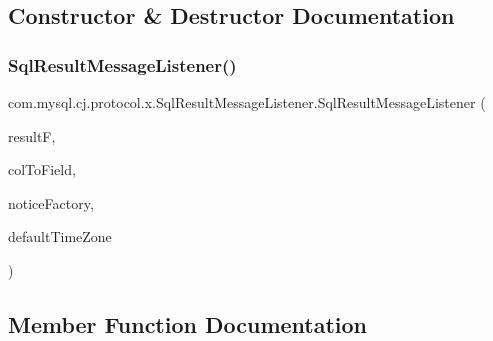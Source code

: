 \subsection{Constructor \& Destructor Documentation}
\mbox{\label{classcom_1_1mysql_1_1cj_1_1protocol_1_1x_1_1_sql_result_message_listener_a7edde22bb73f2b236c3f36064b394ab7}} 
\subsubsection{\texorpdfstring{Sql\+Result\+Message\+Listener()}{SqlResultMessageListener()}}
{\footnotesize\ttfamily com.\+mysql.\+cj.\+protocol.\+x.\+Sql\+Result\+Message\+Listener.\+Sql\+Result\+Message\+Listener (\begin{DoxyParamCaption}\item[{Completable\+Future$<$ \mbox{\hyperlink{interfacecom_1_1mysql_1_1cj_1_1xdevapi_1_1_sql_result}{Sql\+Result}} $>$}]{resultF,  }\item[{\mbox{\hyperlink{interfacecom_1_1mysql_1_1cj_1_1protocol_1_1_protocol_entity_factory}{Protocol\+Entity\+Factory}}$<$ \mbox{\hyperlink{classcom_1_1mysql_1_1cj_1_1result_1_1_field}{Field}}, \mbox{\hyperlink{classcom_1_1mysql_1_1cj_1_1protocol_1_1x_1_1_x_message}{X\+Message}} $>$}]{col\+To\+Field,  }\item[{\mbox{\hyperlink{interfacecom_1_1mysql_1_1cj_1_1protocol_1_1_protocol_entity_factory}{Protocol\+Entity\+Factory}}$<$ \mbox{\hyperlink{classcom_1_1mysql_1_1cj_1_1protocol_1_1x_1_1_notice}{Notice}}, \mbox{\hyperlink{classcom_1_1mysql_1_1cj_1_1protocol_1_1x_1_1_x_message}{X\+Message}} $>$}]{notice\+Factory,  }\item[{Time\+Zone}]{default\+Time\+Zone }\end{DoxyParamCaption})}



\subsection{Member Function Documentation}
\mbox{\label{classcom_1_1mysql_1_1cj_1_1protocol_1_1x_1_1_sql_result_message_listener_a6d9d429bc58631ea5146aca4e841090f}} 

